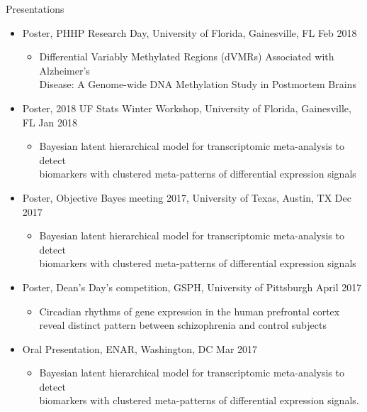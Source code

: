 \documentclass{resume} %
\begin{document}
\begin{rSection}{Presentations}
\begin{itemize}[noitemsep,topsep=0pt]
\item Poster, PHHP Research Day, University of Florida, Gainesville, FL \hfill {Feb 2018}
\begin{itemize}[noitemsep,topsep=0pt]
\item{Differential Variably Methylated Regions (dVMRs) Associated with Alzheimer's \\Disease: A Genome-wide DNA Methylation Study in Postmortem Brains}
\end{itemize}


\item  Poster, 2018 UF Stats Winter Workshop, University of Florida, Gainesville, FL \hfill {Jan 2018}
\begin{itemize}[noitemsep,topsep=0pt]
\item{Bayesian latent hierarchical model for transcriptomic meta-analysis to detect\\ biomarkers with clustered meta-patterns of differential expression signals}
\end{itemize}

\item  Poster, Objective Bayes meeting 2017, University of Texas, Austin, TX \hfill {Dec 2017}
\begin{itemize}[noitemsep,topsep=0pt]
\item{Bayesian latent hierarchical model for transcriptomic meta-analysis to detect\\ biomarkers with clustered meta-patterns of differential expression signals}
\end{itemize}

\item  Poster, Dean's Day's competition, GSPH, University of Pittsburgh \hfill {April 2017}
\begin{itemize}[noitemsep,topsep=0pt]
\item{Circadian rhythms of gene expression in the human prefrontal cortex \\reveal distinct pattern between schizophrenia and control subjects}
\end{itemize}

\item Oral Presentation, ENAR, Washington, DC \hfill {Mar 2017}
\begin{itemize}[noitemsep,topsep=0pt]
\item{Bayesian latent hierarchical model for transcriptomic meta-analysis to detect\\ biomarkers with clustered meta-patterns of differential expression signals.}
\end{itemize}





\end{itemize}
\end{rSection}
\end{document}
